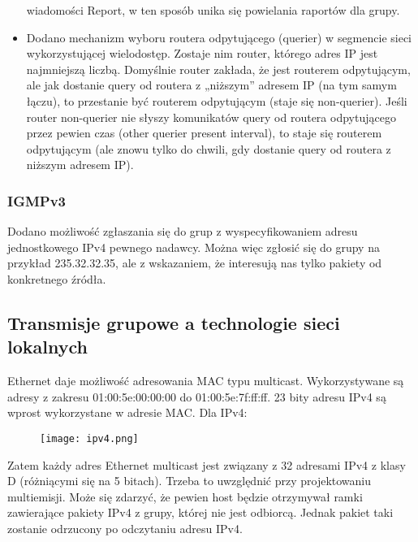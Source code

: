 \documentclass[../main.tex]{subfiles}
\begin{document}
\begin{itemize}
        wiadomości Report, w ten sposób unika się powielania raportów dla grupy.
        \item Dodano mechanizm wyboru routera odpytującego (querier) w segmencie sieci
        wykorzystującej wielodostęp. Zostaje nim router, którego adres IP jest najmniejszą
        liczbą. Domyślnie router zakłada, że jest routerem
        odpytującym, ale jak dostanie query od routera z „niższym” adresem IP (na tym
        samym łączu), to przestanie być routerem odpytującym (staje się non-querier). Jeśli
        router non-querier nie słyszy komunikatów query od routera odpytującego przez
        pewien czas (other querier present interval), to staje się routerem odpytującym (ale
        znowu tylko do chwili, gdy dostanie query od routera z niższym adresem IP).
    \end{itemize}

    \subsubsection{IGMPv3}

    Dodano możliwość zgłaszania się do grup z wyspecyfikowaniem adresu
    jednostkowego IPv4 pewnego nadawcy. Można więc zgłosić się do grupy
    na przykład 235.32.32.35, ale z wskazaniem, że interesują nas tylko pakiety od konkretnego
    źródła.


    \subsection{Transmisje grupowe a technologie sieci lokalnych}

    Ethernet daje możliwość adresowania MAC typu multicast. Wykorzystywane są adresy z
    zakresu 01:00:5e:00:00:00 do 01:00:5e:7f:ff:ff. 23 bity adresu IPv4 są wprost wykorzystane w
    adresie MAC.
    Dla IPv4:

    \begin{figure}[H]
        \texttt{[image: ipv4.png]}
    \end{figure}

    Zatem każdy adres Ethernet multicast jest związany z 32 adresami IPv4 z klasy D (różniącymi
    się na 5 bitach). Trzeba to uwzględnić przy projektowaniu multiemisji. Może się zdarzyć, że
    pewien host będzie otrzymywał ramki zawierające pakiety IPv4 z grupy, której nie jest
    odbiorcą. Jednak pakiet taki zostanie odrzucony po odczytaniu adresu IPv4.
\end{document}

